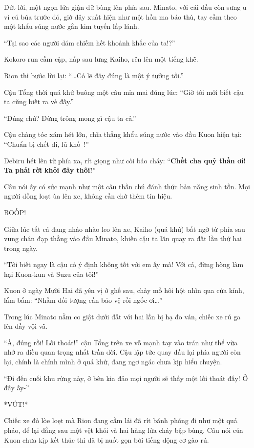 \documentclass[../main.tex]{subfiles}
\begin{document}
Dứt lời, một ngọn lửa giận dữ bùng lên phía sau. Minato, với cái đầu còn sưng u vì cú búa trước đó, giờ đây xuất hiện như một hồn ma báo thù, tay cầm theo một khẩu súng nước gắn kim tuyến lấp lánh.


``Tại sao các người dám chiếm hết khoảnh khắc của ta!?''

Kokoro run cầm cập, nấp sau lưng Kaiho, rên lên một tiếng khẽ.

Rion thì bước lùi lại: ``\dots Có lẽ đây đúng là một ý tưởng tồi.''

Cậu Tổng thời quá khứ buông một câu mỉa mai đúng lúc: ``Giờ tôi mới biết cậu ta cũng biết ra vẻ đấy.''

``Đúng chứ? Đừng trông mong gì cậu ta cả.''

Cậu chàng tóc xám hét lớn, chĩa thẳng khẩu súng nước vào đầu Kuon hiện tại: ``Chuẩn bị chết đi, lũ khố--!''

Debiru hét lên từ phía xa, rít giọng như còi báo cháy: ``\textbf{Chết cha quỷ thần ơi! Ta phải rời khỏi đây thôi!}''

Câu nói ấy có sức mạnh như một câu thần chú đánh thức bản năng sinh tồn. Mọi người đồng loạt ùa lên xe, không cần chờ thêm tín hiệu.

BOỐP!

Giữa lúc tất cả đang nháo nhào leo lên xe, Kaiho (quá khứ) bất ngờ từ phía sau vung chân đạp thẳng vào đầu Minato, khiến cậu ta lăn quay ra đất lần thứ hai trong ngày.

``Tôi biết ngay là cậu có ý định không tốt với em ấy mà! Với cả, đừng hòng làm hại Kuon-kun và Suzu của tôi!''

Kuon ở ngày Mười Hai đã yên vị ở ghế sau, chảy mồ hôi hột nhìn qua cửa kính, lẩm bẩm: ``Nhầm đối tượng cần bảo vệ rồi ngốc ơi\dots''

Trong lúc Minato nằm co giật dưới đất với hai lần bị hạ đo ván, chiếc xe rú ga lên đầy vội vã.

``À, đúng rồi! Lối thoát!'' cậu Tổng trên xe vỗ mạnh tay vào trán như thể vừa nhớ ra điều quan trọng nhất trần đời. Cậu lập tức quay đầu lại phía người còn lại, chính là chính mình ở quá khứ, đang ngơ ngác chưa kịp hiểu chuyện.

``Đi đến cuối khu rừng này, ở bên kia đảo mọi người sẽ thấy một lối thoát đấy! Ở đấy ấy-''

*VÚT!*

Chiếc xe đỏ lòe loẹt mà Rion đang cầm lái đã rít bánh phóng đi như một quả pháo, để lại đằng sau một vệt khói và hai hàng lửa cháy bập bùng. Câu nói của Kuon chưa kịp kết thúc thì đã bị nuốt gọn bởi tiếng động cơ gào rú.
\end{document}

